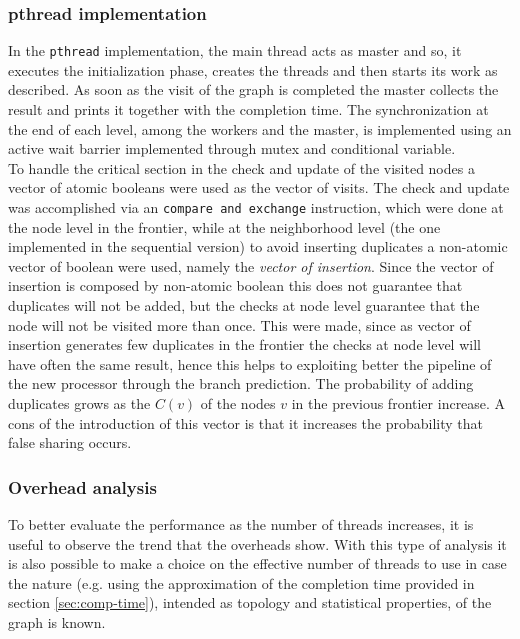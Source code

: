 \subsubsection{pthread implementation}
In the \texttt{pthread} implementation, the main thread acts as master and so, 
it executes the initialization phase, creates 
the threads and then starts its work as described. As soon as the visit of the graph
is completed the master collects the result and prints it together with the completion time. The synchronization at the end of each level, among the workers and the master, 
is implemented using an active wait barrier implemented through mutex and conditional variable.
\\
To handle the critical section in the check and update of the visited nodes a vector of atomic booleans were used as the vector of visits. The check and update was accomplished via an \texttt{compare and exchange} instruction, which were done at the node level in the frontier, while at the neighborhood level (the one implemented in the sequential version) to avoid inserting duplicates a non-atomic vector of boolean were used, namely the \textit{vector of insertion}. Since the vector of insertion is composed by non-atomic boolean this does not guarantee that duplicates will not be added, but the checks at node level guarantee that the node will not be visited more than once. This were made, since as vector of insertion generates few duplicates in the frontier the checks at node level will have often the same result, hence this helps to exploiting better the pipeline of the new processor through the branch prediction. The probability of adding duplicates grows as the $C(v)$ of the nodes $v$ in the previous frontier increase. A cons of the introduction of this vector is that it increases the probability that false sharing occurs.
\subsubsection{Overhead analysis}
\label{sec:overhead}
To better evaluate the performance as the number of threads increases, it is useful to observe the trend that the overheads show. With this type of analysis it is also possible to make a choice on the effective number of threads to use in case the nature (e.g. using the approximation of the completion time provided in section \ref{sec:comp-time}), intended as topology and statistical properties, of the graph is known. 
